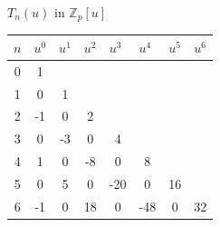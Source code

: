 \documentclass{beamer}
\begin{document}
\begin{frame}{$T_n(u)$ in $\mathbb{Z}_p[u]$}
 \vspace{-6pt}
 \begin{table}[]
  \begin{tabular}{|c|c|c|c|c|c|c|c|}
   \hline
   \multicolumn{1}{|l|}{$n$} & \multicolumn{1}{l|}{$u^0$} & \multicolumn{1}{l|}{$u^1$} & \multicolumn{1}{l|}{$u^2$} & \multicolumn{1}{l|}{$u^3$} & \multicolumn{1}{l|}{$u^4$} & \multicolumn{1}{l|}{$u^5$} & \multicolumn{1}{l|}{$u^6$} \\ \hline
   0                         & 1                          &                            &                            &                            &                            &                            &                            \\ \hline
   1                         & 0                          & 1                          &                            &                            &                            &                            &                            \\ \hline
   2                         & -1                         & 0                          & 2                          &                            &                            &                            &                            \\ \hline
   3                         & 0                          & -3                         & 0                          & 4                          &                            &                            &                            \\ \hline
   4                         & 1                          & 0                          & -8                         & 0                          & 8                          &                            &                            \\ \hline
   5                         & 0                          & 5                          & 0                          & -20                        & 0                          & 16                         &                            \\ \hline
   6                         & -1                         & 0                          & 18                         & 0                          & -48                        & 0                          & 32                         \\ \hline
  \end{tabular}
 \end{table}
\end{frame}
\end{document}

